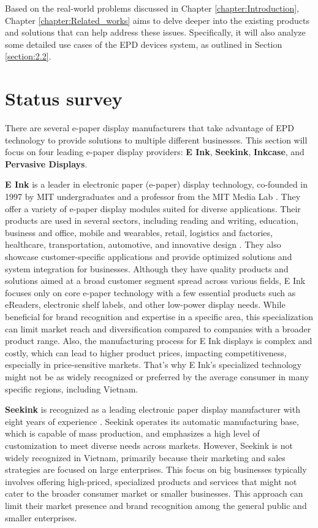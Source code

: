 \documentclass[../Main.tex]{subfiles}
\begin{document}
Based on the real-world problems discussed in Chapter \ref{chapter:Introduction}, Chapter \ref{chapter:Related_works} aims to delve deeper into the existing products and solutions that can help address these issues. Specifically, it will also analyze some detailed use cases of the \gls{EPD} devices system, as outlined in Section \ref{section:2.2}.

\section{Status survey}
\label{section:2.1}
There are several e-paper display manufacturers that take advantage of \gls{EPD} technology to provide solutions to multiple different businesses. This section will focus on four leading e-paper display providers: \textbf{E Ink}, \textbf{Seekink}, \textbf{Inkcase}, and \textbf{Pervasive Displays}.

\textbf{E Ink} is a leader in electronic paper (e-paper) display technology, co-founded in 1997 by MIT undergraduates and a professor from the MIT Media Lab \cite{eink-company}. They offer a variety of e-paper display modules suited for diverse applications. Their products are used in several sectors, including reading and writing, education, business and office, mobile and wearables, retail, logistics and factories, healthcare, transportation, automotive, and innovative design \cite{eink-products}. They also showcase customer-specific applications and provide optimized solutions and system integration for businesses. Although they have quality products and solutions aimed at a broad customer segment spread across various fields, E Ink focuses only on core e-paper technology with a few essential products such as eReaders, electronic shelf labels, and other low-power display needs. While beneficial for brand recognition and expertise in a specific area, this specialization can limit market reach and diversification compared to companies with a broader product range. Also, the manufacturing process for E Ink displays is complex and costly, which can lead to higher product prices, impacting competitiveness, especially in price-sensitive markets. That's why E Ink's specialized technology might not be as widely recognized or preferred by the average consumer in many specific regions, including Vietnam.

\textbf{Seekink} is recognized as a leading electronic paper display manufacturer with eight years of experience \cite{seekink-techdailyweb}. Seekink operates its automatic manufacturing base, which is capable of mass production, and emphasizes a high level of customization to meet diverse needs across markets. However, Seekink is not widely recognized in Vietnam, primarily because their marketing and sales strategies are focused on large enterprises. This focus on big businesses typically involves offering high-priced, specialized products and services that might not cater to the broader consumer market or smaller businesses. This approach can limit their market presence and brand recognition among the general public and smaller enterprises. 
\end{document}
